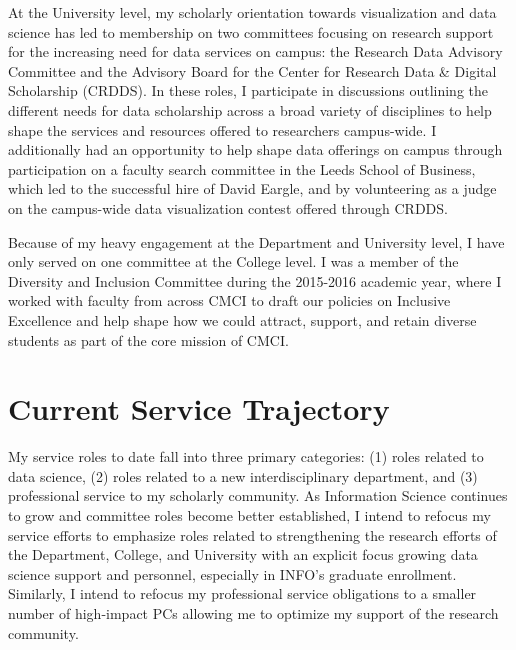 \documentclass[11pt]{article}
\begin{document}

At the University level, my scholarly orientation towards visualization and data science has led to membership on two committees focusing on research support for the increasing need for data services on campus: the Research Data Advisory Committee and the Advisory Board for the Center for Research Data \& Digital Scholarship (CRDDS). In these roles, I participate in discussions outlining the different needs for data scholarship across a broad variety of disciplines to help shape the services and resources offered to researchers campus-wide. I additionally had an opportunity to help shape data offerings on campus through participation on a faculty search committee in the Leeds School of Business, which led to the successful hire of David Eargle, and by volunteering as a judge on the campus-wide data visualization contest offered through CRDDS. 

Because of my heavy engagement at the Department and University level, I have only served on one committee at the College level. I was a member of the Diversity and Inclusion Committee during the 2015-2016 academic year, where I worked with faculty from across CMCI to draft our policies on Inclusive Excellence and help shape how we could attract, support, and retain diverse students as part of the core mission of CMCI.


\section*{Current Service Trajectory}
My service roles to date fall into three primary categories: (1) roles related to data science, (2) roles related to a new interdisciplinary department, and (3) professional service to my scholarly community. As Information Science continues to grow and committee roles become better established, I intend to refocus my service efforts to emphasize roles related to strengthening the research efforts of the Department, College, and University with an explicit focus growing data science support and personnel, especially in INFO's graduate enrollment. Similarly, I intend to refocus my professional service obligations to a smaller number of high-impact PCs allowing me to optimize my support of the research community. 

\pagebreak
\setcounter{page}{1}
\end{document}
